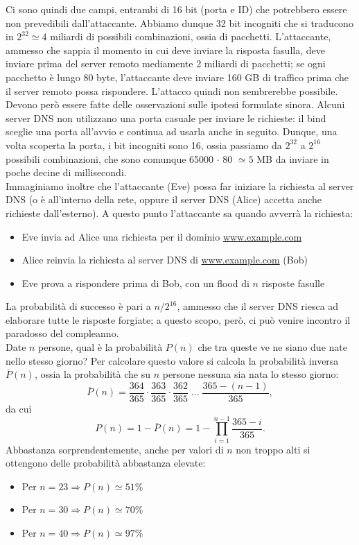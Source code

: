 Ci sono quindi due campi, entrambi di 16 bit (porta e ID) che potrebbero essere non prevedibili dall'attaccante. Abbiamo dunque 32 bit incogniti che si traducono in $2^{32} \simeq 4$ miliardi di possibili combinazioni, ossia di pacchetti. L'attaccante, ammesso che sappia il momento in cui deve inviare la risposta fasulla, deve inviare prima del server remoto mediamente 2 miliardi di pacchetti; se ogni pacchetto è lungo 80 byte, l'attaccante deve inviare 160 GB di traffico prima che il server remoto possa rispondere. L'attacco quindi non sembrerebbe possibile.\\
Devono però essere fatte delle osservazioni sulle ipotesi formulate sinora. Alcuni server DNS non utilizzano una porta casuale per inviare le richieste: il bind sceglie una porta all'avvio e continua ad usarla anche in seguito. Dunque, una volta scoperta la porta, i bit incogniti sono 16, ossia passiamo da $2^{32}$ a $2^{16}$ possibili combinazioni, che sono comunque 65000 $\cdot$ 80 $\simeq 5$ MB da inviare in poche decine di millisecondi.\\
Immaginiamo inoltre che l'attaccante (Eve) possa far iniziare la richiesta al server DNS (o è all'interno della rete, oppure il server DNS (Alice) accetta anche richieste dall'esterno). A questo punto l'attaccante sa quando avverrà la richiesta:
\begin{itemize}
	\item Eve invia ad Alice una richiesta per il dominio \url{www.example.com}
	\item Alice reinvia la richiesta al server DNS di \url{www.example.com} (Bob)
	\item Eve prova a rispondere prima di Bob, con un flood di $n$ risposte fasulle
\end{itemize}
La probabilità di successo è pari a $n/2^{16}$, ammesso che il server DNS riesca ad elaborare tutte le risposte forgiate; a questo scopo, però, ci può venire incontro il paradosso del compleanno.\\
Date $n$ persone, qual è la probabilità $P(n)$ che tra queste ve ne siano due nate nello stesso giorno? Per calcolare questo valore si calcola la probabilità inversa $\bar{P}(n)$, ossia la probabilità che su $n$ persone nessuna sia nata lo stesso giorno:
$$\bar{P}(n) = \frac{364}{365}\cdot\frac{363}{365}\cdot\frac{362}{365}\;\ldots\;\frac{365-(n-1)}{365},$$
da cui
$$P(n) = 1-\bar{P}(n) = 1-\prod_{i=1}^{n-1}\frac{365-i}{365}.$$
Abbastanza sorprendentemente, anche per valori di $n$ non troppo alti si ottengono delle probabilità abbastanza elevate:
\begin{itemize}
	\item Per $n=23 \Longrightarrow P(n) \simeq 51\%$
	\item Per $n=30 \Longrightarrow P(n) \simeq 70\%$
	\item Per $n=40 \Longrightarrow P(n) \simeq 97\%$
\end{itemize}
